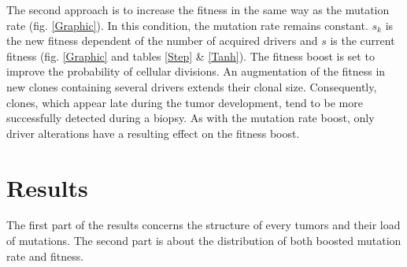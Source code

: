 \documentclass[a4paper]{article}
\begin{document}
\begin{multicols}{2}

The second approach is to increase the fitness in the same way as the mutation rate (fig. \ref{Graphic}). In this condition, the mutation rate remains constant. $s_k$ is the new fitness dependent of the number of acquired drivers and $s$ is the current fitness (fig. \ref{Graphic} and tables \ref{Step} \& \ref{Tanh}). The fitness boost is set to improve the probability of cellular divisions. An augmentation of the fitness in new clones containing several drivers extends their clonal size. Consequently, clones, which appear late during the tumor development, tend to be more successfully detected during a biopsy. As with the mutation rate boost, only driver alterations have a resulting effect on the fitness boost. 





\section{Results}
The first part of the results concerns the structure of every tumors and their load of mutations. The second part is about the distribution of both boosted mutation rate and fitness. 


\end{multicols}
\end{document}
